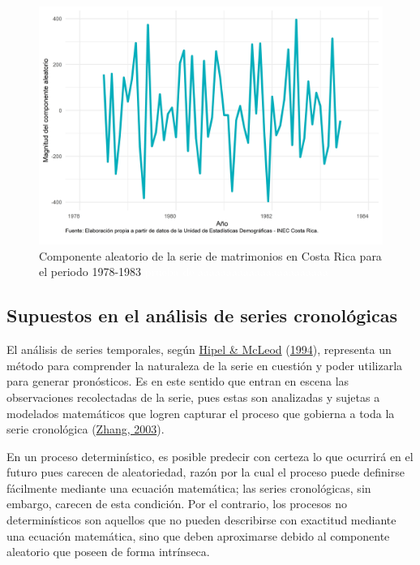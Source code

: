 \documentclass[
]{article}
\begin{document}
\begin{figure}[H]
\includegraphics[width=1\linewidth,height=1\textheight]{Tesis_files/figure-latex/ejemplo_aleatorio-1} \caption{Componente aleatorio de la serie de matrimonios en Costa Rica para el periodo 1978-1983 \textcolor{white}{prueba de aaaaaaaaaaaaaaaaaaaaaaa}}\label{fig:ejemplo_aleatorio}
\end{figure}

\subsection{Supuestos en el análisis de series cronológicas}

El análisis de series temporales, según
\protect\hyperlink{ref-Hipel}{Hipel \& McLeod}
(\protect\hyperlink{ref-Hipel}{1994}), representa un método para
comprender la naturaleza de la serie en cuestión y poder utilizarla para
generar pronósticos. Es en este sentido que entran en escena las
observaciones recolectadas de la serie, pues estas son analizadas y
sujetas a modelados matemáticos que logren capturar el proceso que
gobierna a toda la serie cronológica
(\protect\hyperlink{ref-Zhang}{Zhang, 2003}).

En un proceso determinístico, es posible predecir con certeza lo que
ocurrirá en el futuro pues carecen de aleatoriedad, razón por la cual el
proceso puede definirse fácilmente mediante una ecuación matemática; las
series cronológicas, sin embargo, carecen de esta condición. Por el
contrario, los procesos no determinísticos son aquellos que no pueden
describirse con exactitud mediante una ecuación matemática, sino que
deben aproximarse debido al componente aleatorio que poseen de forma
intrínseca.
\end{document}
